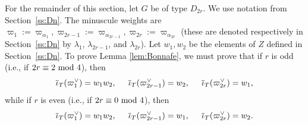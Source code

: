 \documentclass[reqno,11pt]{amsart}
\theoremstyle{remark}
\theoremstyle{remark}
\theoremstyle{definition}
\theoremstyle{definition}
\theoremstyle{definition}
\numberwithin{equation}{section}
\newcommand{\ga}{\alpha}
\def\ibarT{\overline{\iota}_T}
\begin{document}
For the remainder of this section, let $G$ be of type $D_{2r}$.  We use notation from Section~\ref{ss:Dn}.  
The minuscule weights are $\varpi_1:= \varpi_{\ga_1}, \varpi_{2r-1}:=\varpi_{\ga_{2r-1}}, \varpi_{2r}:=\varpi_{\ga_{2r}}$ (these are denoted respectively in Section~\ref{ss:Dn} by $\lambda_1$, $\lambda_{2r-1}$, and $\lambda_{2r}$).
Let $w_1, w_2$ be the elements of $Z$ defined in Section~\ref{ss:Dn}.
To prove Lemma \ref{lem:Bonnafe}, we must prove that if $r$ is odd (i.e., if $2r \equiv 2 \textup{ mod } 4$), then
\begin{equation} \label{e:Bonnafe-odd}
\ibarT(\varpi_1^{\vee})  = w_1 w_2 , \hspace{.2in} \ibarT(\varpi_{2r-1}^{\vee})  = w_2 , \hspace{.2in}  \ibarT(\varpi_{2r}^{\vee})  = w_1,
\end{equation}
while if $r$ is even (i.e., if $2r \equiv 0 \textup{ mod } 4$), then
\begin{equation} \label{e:Bonnafe-even}
\ibarT(\varpi_1^{\vee})   = w_1 w_2 , \hspace{.2in}   \ibarT(\varpi_{2r-1}^{\vee})  = w_1 , \hspace{.2in}  \ibarT(\varpi_{2r}^{\vee})  = w_2.
\end{equation}
\end{document}

